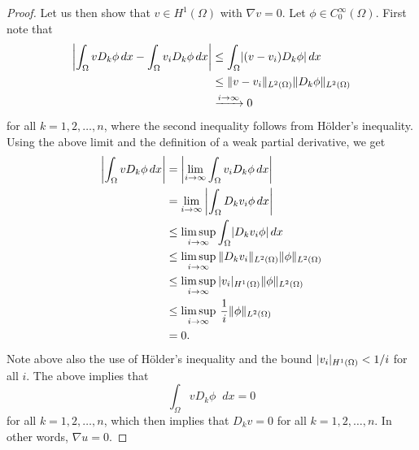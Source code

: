 \documentclass[english, 12pt, a4paper, sci, utf8, a-2b, online]{aaltothesis}
\theoremstyle{definition}
\theoremstyle{plain}
\DeclarePairedDelimiter\abs{\lvert}{\rvert}
\DeclarePairedDelimiter\norm{\lVert}{\rVert}
\newcommand*\diff{\mathop{}\!d}
\numberwithin{equation}{section}
\begin{document}
\begin{proof}
    Let us then show that $v \in H^1(\Omega)$ with $\nabla v = 0$.
    Let $\phi \in C_0^{\infty}(\Omega)$. First note that
    \begin{align*}
        \abs*{\int_{\Omega} v D_k \phi \diff x
            - \int_{\Omega} v_i D_k \phi \diff x}
        &\leq \int_{\Omega} \abs*{(v - v_i) D_k \phi} \diff x \\
        &\leq \norm{v - v_i}_{L^2(\Omega)} \norm{D_k \phi}_{L^2(\Omega)} \\
        &\xrightarrow[]{i \to \infty} 0
    \end{align*}
    for all $k=1,2,\dotsc,n$, where the second inequality follows from
    Hölder's inequality. Using the above limit and the definition of a weak partial derivative, we get
    \begin{align*}
        \abs*{\int_{\Omega} v D_k \phi \diff x}
        &= \abs*{\lim_{i \to \infty} \int_{\Omega} v_i D_k \phi \diff x} \\
        &= \lim_{i \to \infty} \hspace{0.7mm}
            \abs*{\int_{\Omega} D_k v_i \phi \diff x} \\
        &\leq \limsup_{i \to \infty} \int_{\Omega} \abs{D_k v_i \phi} \diff x \\
        &\leq \limsup_{i \to \infty} \hspace{0.7mm} \norm{D_k v_i}_{L^2(\Omega)}
            \norm{\phi}_{L^2(\Omega)} \\
        &\leq \limsup_{i \to \infty} \hspace{0.7mm} \abs{v_i}_{H^1(\Omega)}
            \norm{\phi}_{L^2(\Omega)} \\
        &\leq \limsup_{i \to \infty} \hspace{0.7mm}
            \frac{1}{i} \norm{\phi}_{L^2(\Omega)} \\
        &= 0.
    \end{align*}
    Note above also the use of Hölder's inequality
    and the bound $\abs{v_i}_{H^1(\Omega)} < 1/i$ for all $i$.
    The above implies that
    \begin{equation*}
        \int_{\Omega} v D_k \phi \diff x = 0
    \end{equation*}
    for all $k=1,2,\dotsc,n$, which then implies that
    $D_k v = 0$ for all $k=1,2,\dotsc,n$. In other words, $\nabla u = 0$.
    

\end{proof}
\end{document}
